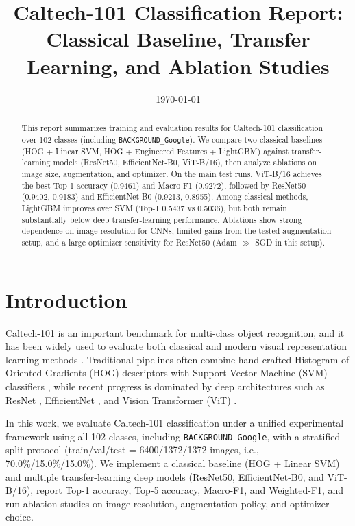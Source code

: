 \documentclass[11pt]{article}
\title{Caltech-101 Classification Report: Classical Baseline, Transfer Learning, and Ablation Studies}
\author{}
\date{\today}
\begin{document}
\maketitle

\begin{abstract}
This report summarizes training and evaluation results for Caltech-101 classification over 102 classes (including \texttt{BACKGROUND\_Google}). We compare two classical baselines (HOG + Linear SVM, HOG + Engineered Features + LightGBM) against transfer-learning models (ResNet50, EfficientNet-B0, ViT-B/16), then analyze ablations on image size, augmentation, and optimizer. On the main test runs, ViT-B/16 achieves the best Top-1 accuracy (0.9461) and Macro-F1 (0.9272), followed by ResNet50 (0.9402, 0.9183) and EfficientNet-B0 (0.9213, 0.8955). Among classical methods, LightGBM improves over SVM (Top-1 0.5437 vs 0.5036), but both remain substantially below deep transfer-learning performance. Ablations show strong dependence on image resolution for CNNs, limited gains from the tested augmentation setup, and a large optimizer sensitivity for ResNet50 (Adam $\gg$ SGD in this setup).
\end{abstract}

\section{Introduction}
Caltech-101 is an important benchmark for multi-class object recognition, and it has been widely used to evaluate both classical and modern visual representation learning methods \cite{feifei2004caltech101}. Traditional pipelines often combine hand-crafted Histogram of Oriented Gradients (HOG) descriptors \cite{dalal2005hog} with Support Vector Machine (SVM) classifiers \cite{cortes1995svm}, while recent progress is dominated by deep architectures such as ResNet \cite{he2016resnet}, EfficientNet \cite{tan2019efficientnet}, and Vision Transformer (ViT) \cite{dosovitskiy2021vit}.

In this work, we evaluate Caltech-101 classification under a unified experimental framework using all 102 classes, including \texttt{BACKGROUND\_Google}, with a stratified split protocol (train/val/test = 6400/1372/1372 images, i.e., 70.0\%/15.0\%/15.0\%). We implement a classical baseline (HOG + Linear SVM) and multiple transfer-learning deep models (ResNet50, EfficientNet-B0, and ViT-B/16), report Top-1 accuracy, Top-5 accuracy, Macro-F1, and Weighted-F1, and run ablation studies on image resolution, augmentation policy, and optimizer choice.
\end{document}

